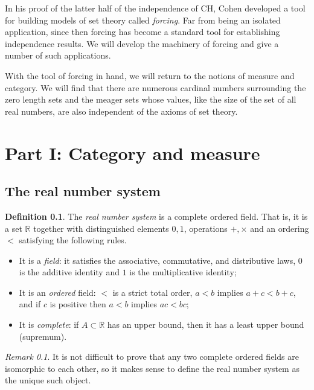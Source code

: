\documentclass[11pt,oneside]{amsbook}
\newcommand{\RR}{\mathbb R}
\theoremstyle{definition}
\theoremstyle{plain}
\theoremstyle{definition}
\newtheorem{defn}[thm]{Definition}
\theoremstyle{remark}
\newtheorem{rem}[thm]{Remark}
\begin{document}
In his proof of the latter half of the independence of CH, Cohen developed a tool for building models of set theory called \emph{forcing}. Far from being an isolated application, since then forcing has become a standard tool for establishing independence results. We will develop the machinery of forcing and give a number of such applications.

With the tool of forcing in hand, we will return to the notions of measure and category. We will find that there are numerous cardinal numbers surrounding the zero length sets and the meager sets whose values, like the size of the set of all real numbers, are also independent of the axioms of set theory.


\chapter*{Part I: Category and measure}

\section{The real number system}

\begin{defn}
  The \emph{real number system} is a complete ordered field. That is, it is a set $\RR$ together with distinguished elements $0,1$, operations $+,\times$ and an ordering $<$ satisfying the following rules.
\begin{itemize}
\item It is a \emph{field}: it satisfies the associative, commutative, and distributive laws, $0$ is the additive identity and $1$ is the multiplicative identity;
\item It is an \emph{ordered} field: $<$ is a strict total order, $a<b$ implies $a+c<b+c$, and if $c$ is positive then $a<b$ implies $ac<bc$;
\item It is \emph{complete}: if $A\subset\RR$ has an upper bound, then it has a least upper bound (supremum).
\end{itemize}
\end{defn}

\begin{rem}
  It is not difficult to prove that any two complete ordered fields are isomorphic to each other, so it makes sense to define the real number system as the unique such object.
\end{rem}
\end{document}
